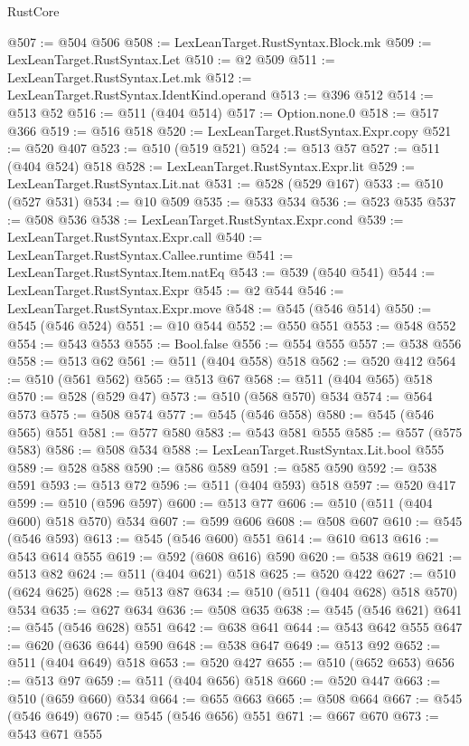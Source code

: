 \begin{lexlean}{RustCore}
\begin{coremodule}
@507 := @504 @506
@508 := LexLeanTarget.RustSyntax.Block.mk
@509 := LexLeanTarget.RustSyntax.Let
@510 := @2 @509
@511 := LexLeanTarget.RustSyntax.Let.mk
@512 := LexLeanTarget.RustSyntax.IdentKind.operand
@513 := @396 @512
@514 := @513 @52
@516 := @511 (@404 @514)
@517 := Option.none.{0}
@518 := @517 @366
@519 := @516 @518
@520 := LexLeanTarget.RustSyntax.Expr.copy
@521 := @520 @407
@523 := @510 (@519 @521)
@524 := @513 @57
@527 := @511 (@404 @524) @518
@528 := LexLeanTarget.RustSyntax.Expr.lit
@529 := LexLeanTarget.RustSyntax.Lit.nat
@531 := @528 (@529 @167)
@533 := @510 (@527 @531)
@534 := @10 @509
@535 := @533 @534
@536 := @523 @535
@537 := @508 @536
@538 := LexLeanTarget.RustSyntax.Expr.cond
@539 := LexLeanTarget.RustSyntax.Expr.call
@540 := LexLeanTarget.RustSyntax.Callee.runtime
@541 := LexLeanTarget.RustSyntax.Item.natEq
@543 := @539 (@540 @541)
@544 := LexLeanTarget.RustSyntax.Expr
@545 := @2 @544
@546 := LexLeanTarget.RustSyntax.Expr.move
@548 := @545 (@546 @514)
@550 := @545 (@546 @524)
@551 := @10 @544
@552 := @550 @551
@553 := @548 @552
@554 := @543 @553
@555 := Bool.false
@556 := @554 @555
@557 := @538 @556
@558 := @513 @62
@561 := @511 (@404 @558) @518
@562 := @520 @412
@564 := @510 (@561 @562)
@565 := @513 @67
@568 := @511 (@404 @565) @518
@570 := @528 (@529 @47)
@573 := @510 (@568 @570) @534
@574 := @564 @573
@575 := @508 @574
@577 := @545 (@546 @558)
@580 := @545 (@546 @565) @551
@581 := @577 @580
@583 := @543 @581 @555
@585 := @557 (@575 @583)
@586 := @508 @534
@588 := LexLeanTarget.RustSyntax.Lit.bool @555
@589 := @528 @588
@590 := @586 @589
@591 := @585 @590
@592 := @538 @591
@593 := @513 @72
@596 := @511 (@404 @593) @518
@597 := @520 @417
@599 := @510 (@596 @597)
@600 := @513 @77
@606 := @510 (@511 (@404 @600) @518 @570) @534
@607 := @599 @606
@608 := @508 @607
@610 := @545 (@546 @593)
@613 := @545 (@546 @600) @551
@614 := @610 @613
@616 := @543 @614 @555
@619 := @592 (@608 @616) @590
@620 := @538 @619
@621 := @513 @82
@624 := @511 (@404 @621) @518
@625 := @520 @422
@627 := @510 (@624 @625)
@628 := @513 @87
@634 := @510 (@511 (@404 @628) @518 @570) @534
@635 := @627 @634
@636 := @508 @635
@638 := @545 (@546 @621)
@641 := @545 (@546 @628) @551
@642 := @638 @641
@644 := @543 @642 @555
@647 := @620 (@636 @644) @590
@648 := @538 @647
@649 := @513 @92
@652 := @511 (@404 @649) @518
@653 := @520 @427
@655 := @510 (@652 @653)
@656 := @513 @97
@659 := @511 (@404 @656) @518
@660 := @520 @447
@663 := @510 (@659 @660) @534
@664 := @655 @663
@665 := @508 @664
@667 := @545 (@546 @649)
@670 := @545 (@546 @656) @551
@671 := @667 @670
@673 := @543 @671 @555

\end{coremodule}
\end{lexlean}
